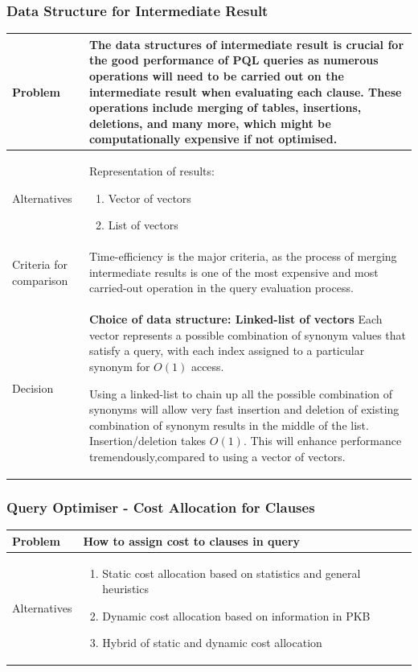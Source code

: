 \documentclass[12pt]{article}
\begin{document}
{{{{{{{{{{{{{\subsubsection{Data Structure for Intermediate Result}
\begin{tabular}{|L{5cm} | L{12cm}| }
\hline
Problem &
The data structures of intermediate result is crucial for the good performance of PQL queries as numerous operations will need to be carried out on the intermediate result when evaluating each clause. These operations include merging of tables, insertions, deletions, and many more, which might be computationally expensive if not optimised.
 \\
    \hline
    Alternatives & Representation of results: \begin{enumerate}
    \item Vector of vectors
    \item List of vectors
    \end{enumerate} \\
\hline
    Criteria for comparison &
Time-efficiency is the major criteria, as the process of merging intermediate results is one of the most expensive and most carried-out operation in the query evaluation process. \\
 \hline
   Decision & \textbf{Choice of data structure: Linked-list of vectors}
\newline
Each vector represents a possible combination of synonym values that satisfy a query, with each index assigned to a particular synonym for $O(1)$ access.

Using a linked-list to chain up all the possible combination of synonyms will allow very fast insertion and deletion of existing combination of synonym results in the middle of the list. Insertion/deletion takes $O(1)$. This will enhance performance tremendously,compared to using a vector of vectors.
 \\
 \hline
\end{tabular}

\subsubsection{Query Optimiser - Cost Allocation for Clauses}
\begin{tabular}{|L{5cm} | L{12cm}| }
\hline
Problem &
How to assign cost to clauses in query
 \\
    \hline
    Alternatives & \begin{enumerate} \item Static cost allocation based on statistics and general heuristics \item Dynamic cost allocation based on information in PKB
\item Hybrid of static and dynamic cost allocation \end{enumerate}


\end{tabular}}}}}}}}}}}}}}
\end{document}
